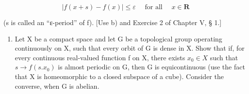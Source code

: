 \[
\left| f (x + s) - f (x) \right| \leqslant \varepsilon \quad \text { for   all } \quad x \in \mathbf {R}
\]

(s is called an ``ε-period'' of f). {[}Use b) and Exercise 2 of Chapter V, § 1.{]}

\begin{enumerate}
\def\labelenumi{\arabic{enumi})}
\setcounter{enumi}{28}
\tightlist
\item
  Let X be a compact space and let G be a topological group operating continuously on X, such that every orbit of G is dense in X. Show that if, for every continuous real-valued function f on X, there exists \(x_{0} \in X\) such that \(s \to f(s.x_{0})\) is almost periodic on G, then G is equicontinuous (use the fact that X is homeomorphic to a closed subspace of a cube). Consider the converse, when G is abelian.
\end{enumerate}
\relax{}
